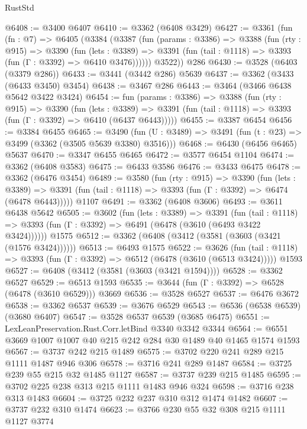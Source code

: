 \begin{lexlean}{RustStd}
\begin{coremodule}
@6408 := @3400 @6407
@6410 := @3362 (@6408 @3429)
@6427 := @3361
    (fun (fn : @7) =>
    @6405
      (@3384
        (@3387
          (fun (params : @3386) =>
          @3388
            (fun (rty : @915) =>
            @3390
              (fun (lets : @3389) =>
              @3391 (fun (tail : @1118) => @3393 (fun (Γ : @3392) => @6410 @3476))))))
        @3522))
    @286
@6430 := @3528 (@6403 (@3379 @286))
@6433 := @3441 (@3442 @286) @5639
@6437 := @3362 (@3433 (@6433 @3450) @3454)
@6438 := @3467 @286
@6443 := @3464 (@3466 @6438 @5642 @3422 @3424)
@6454 := fun (params : @3386) =>
  @3388
    (fun (rty : @915) =>
    @3390
      (fun (lets : @3389) =>
      @3391 (fun (tail : @1118) => @3393 (fun (Γ : @3392) => @6410 (@6437 @6443)))))
@6455 := @3387 @6454
@6456 := @3384 @6455
@6465 := @3490 (fun (U : @3489) => @3491 (fun (t : @23) => @3499 (@3362 (@3505 @5639 @3380) @3516)))
@6468 := @6430 (@6456 @6465) @5637
@6470 := @3347 @6455 @6465
@6472 := @3577 @6454 @1104
@6474 := @3362 (@6408 @3583)
@6475 := @6433 @3586
@6476 := @3433 @6475
@6478 := @3362 (@6476 @3454)
@6489 := @3580
    (fun (rty : @915) =>
    @3390
      (fun (lets : @3389) =>
      @3391 (fun (tail : @1118) => @3393 (fun (Γ : @3392) => @6474 (@6478 @6443)))))
    @1107
@6491 := @3362 (@6408 @3606)
@6493 := @3611 @6438 @5642
@6505 := @3602
    (fun (lets : @3389) =>
    @3391
      (fun (tail : @1118) => @3393 (fun (Γ : @3392) => @6491 (@6478 (@3610 (@6493 @3422 @3424))))))
    @1575
@6512 := @3362 (@6408 (@3412 (@3581 (@3603 (@3421 (@1576 @3424))))))
@6513 := @6493 @1575
@6522 := @3626
    (fun (tail : @1118) => @3393 (fun (Γ : @3392) => @6512 (@6478 (@3610 (@6513 @3424)))))
    @1593
@6527 := @6408 (@3412 (@3581 (@3603 (@3421 @1594))))
@6528 := @3362 @6527
@6529 := @6513 @1593
@6535 := @3644 (fun (Γ : @3392) => @6528 (@6478 (@3610 @6529))) @3669
@6536 := @3528 @6527
@6537 := @6476 @3672
@6538 := @3362 @6537
@6539 := @3676 @6529
@6543 := @6536 (@6538 @6539) (@3680 @6407)
@6547 := @3528 @6537 @6539 (@3685 @6475)
@6551 := LexLeanPreservation.Rust.Corr.letBind @3340 @3342 @3344
@6564 := @6551 @3669 @1007 @1007 @40 @215 @242 @284 @30 @1489 @40 @1465 @1574 @1593
@6567 := @3737 @242 @215 @1489
@6575 := @3702 @220 @241 @289 @215 @1111 @1487 @946 @306
@6578 := @3716 @241 @289 @1487
@6584 := @3725 @239 @55 @215 @32 @1485 @1127
@6587 := @3737 @239 @215 @1485
@6595 := @3702 @225 @238 @313 @215 @1111 @1483 @946 @324
@6598 := @3716 @238 @313 @1483
@6604 := @3725 @232 @237 @310 @312 @1474 @1482
@6607 := @3737 @232 @310 @1474
@6623 := @3766
    @230
    @55
    @32
    @308
    @215
    @1111
    @1127
    @3774

\end{coremodule}
\end{lexlean}
